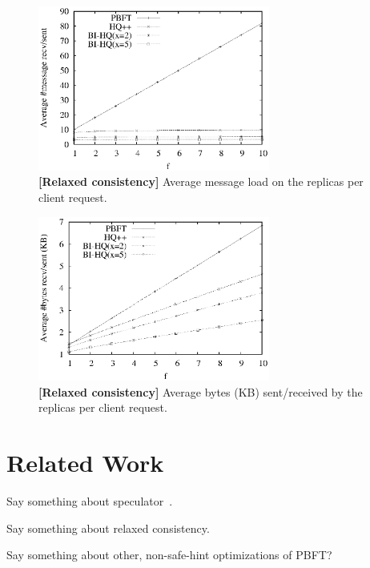\documentclass[twocolumn,10pt]{article}
\begin{document}
\begin{figure}
\centering
\includegraphics[width=3in]{Figures/Mesg_Count_Comp_BI_HQS.ps}
\caption{\textbf{[Relaxed consistency]} Average message load on the replicas
per client request.
}
\label{fig:mesg_comp_bi}
\end{figure}

\begin{figure}
\centering
\includegraphics[width=3in]{Figures/Byte_Count_Comp_BI_New.ps}
\caption{\textbf{[Relaxed consistency]} Average bytes (KB) sent/received by the replicas per client
request.
}
\label{fig:bytes_comp_bi_new}
\end{figure}

\fi


\section{Related Work}

Say something about speculator~\cite{Speculator-sosp-05}.

Say something about relaxed consistency.

Say something about other, non-safe-hint optimizations of PBFT?

\fi
\end{document}
